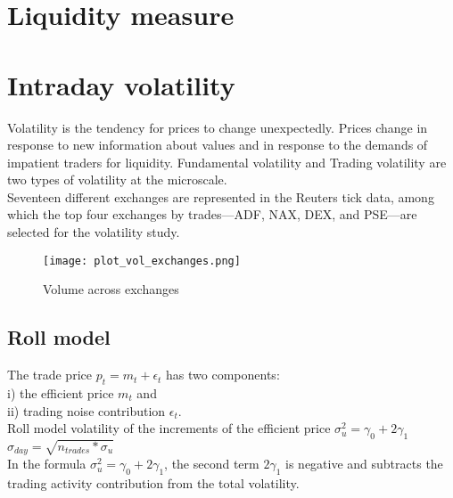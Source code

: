 \documentclass{article}
\begin{document}
\section{Liquidity measure}

\section{Intraday volatility}

Volatility is the tendency for prices to change unexpectedly. Prices change in response to new information about values and in response to the demands of impatient traders for liquidity. Fundamental volatility and Trading volatility are two types of volatility at the microscale. \\

Seventeen different exchanges are represented in the Reuters tick data, among which the top four exchanges by trades—ADF, NAX, DEX, and PSE—are selected for the volatility study.


\begin{figure}[H]
\centering
\begin{adjustbox}{max width=\textwidth}
    \texttt{[image: plot\_vol\_exchanges.png]}
\end{adjustbox}
\caption{Volume across exchanges}
\label{fig:vol_across_exchanges}
\end{figure}

\subsection{Roll model}

The trade price $p_t = m_t + \epsilon_t$ has two components: \\

i) the efficient price $m_t$ and \\

ii) trading noise contribution $\epsilon_t$. \\

Roll model volatility of the increments of the efficient price $\sigma_{u}^2 =\gamma_0 + 2\gamma_1$ \\

$\sigma_{day} = \sqrt{n_{trades} * \sigma_u}$ \\

In the formula $\sigma_{u}^2 =\gamma_0 + 2\gamma_1$, the second term $2\gamma_1$ is negative and subtracts the trading activity contribution from the total volatility. \\
\end{document}
